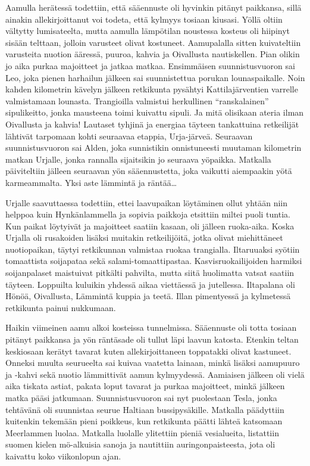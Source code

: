 \begin{multicols}{2}
Aamulla herätessä todettiin, että sääennuste oli hyvinkin pitänyt paikkansa, sillä ainakin allekirjoittanut voi todeta, että kylmyys tosiaan kiusasi. Yöllä oltiin vältytty lumisateelta, mutta aamulla lämpötilan noustessa kosteus oli hiipinyt sisään telttaan, jolloin varusteet olivat kostuneet. Aamupalalla sitten kuivateltiin varusteita nuotion ääressä, puuroa, kahvia ja Oivallusta nautiskellen. Pian olikin jo aika purkaa majoitteet ja jatkaa matkaa. Ensimmäisen suunnistusvuoron sai Leo, joka pienen harhailun jälkeen sai suunnistettua porukan lounaspaikalle. Noin kahden kilometrin kävelyn jälkeen retkikunta pysähtyi Kattilajärventien varrelle valmistamaan lounasta. Trangioilla valmistui herkullinen “ranskalainen” sipulikeitto, jonka mausteena toimi kuivattu sipuli. Ja mitä olisikaan ateria ilman Oivallusta ja kahvia! Lautaset tyhjinä ja energiaa täyteen tankattuina retkeilijät lähtivät tarpomaan kohti seuraavaa etappia, Urja-järveä. Seuraavan suunnistusvuoron sai Alden, joka sunnistikin onnistuneesti muutaman kilometrin matkan Urjalle, jonka rannalla sijaitsikin jo seuraava yöpaikka. Matkalla päiviteltiin jälleen seuraavan yön sääennustetta, joka vaikutti aiempaakin yötä karmeammalta. Yksi aste lämmintä ja räntää… 

Urjalle saavuttaessa todettiin, ettei laavupaikan löytäminen ollut yhtään niin helppoa kuin Hynkänlammella ja sopivia paikkoja etsittiin miltei puoli tuntia. Kun paikat löytyivät ja majoitteet saatiin kasaan, oli jälleen ruoka-aika. Koska Urjalla oli rusakoiden lisäksi muitakin retkeilijöitä, jotka olivat miehittäneet nuotiopaikan, täytyi retkikunnan valmistaa ruokaa trangialla. Iltaruuaksi syötiin tomaattista soijapataa sekä salami-tomaattipastaa. Kasvisruokailijoiden harmiksi soijanpalaset maistuivat pitkälti pahvilta, mutta siitä huolimatta vatsat saatiin täyteen. Loppuilta kuluikin yhdessä aikaa viettäessä ja jutellessa. Iltapalana oli Hönöä, Oivallusta, Lämmintä kuppia ja teetä. Illan pimentyessä ja kylmetessä retkikunta painui nukkumaan.

Haikin viimeinen aamu alkoi kosteissa tunnelmissa. Sääennuste oli totta tosiaan pitänyt paikkansa ja yön räntäsade oli tullut läpi laavun katosta. Etenkin teltan keskiosaan kerätyt tavarat kuten allekirjoittaneen toppatakki olivat kastuneet. Onneksi muulta seurueelta sai kuivaa vaatetta lainaan, minkä lisäksi aamupuuro ja -kahvi sekä nuotio lämmittivät aamun kylmyydessä. Aamiaisen jälkeen oli vielä aika tiskata astiat, pakata loput tavarat ja purkaa majoitteet, minkä jälkeen matka pääsi jatkumaan. Suunnistusvuoron sai nyt puolestaan Tesla, jonka tehtävänä oli suunnistaa seurue Haltiaan bussipysäkille. Matkalla päädyttiin kuitenkin tekemään pieni poikkeus, kun retkikunta päätti lähteä katsomaan Meerlammen luolaa. Matkalla luolalle ylitettiin pieniä vesialueita, listattiin suomen kielen mö-alkuisia sanoja ja nautittiin auringonpaisteesta, jota oli kaivattu koko viikonlopun ajan.


\end{multicols}
